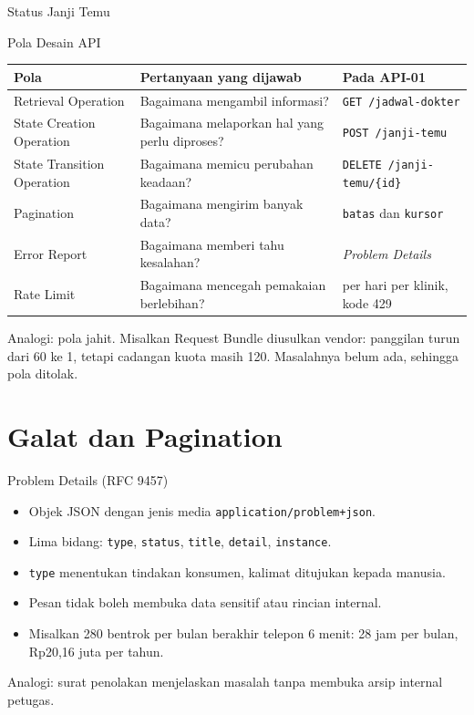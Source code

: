 \documentclass[aspectratio=169, table, 12pt]{beamer}
\begin{document}
\begin{frame}{{\Large Status Janji Temu}}
  \centering
\end{frame}

\begin{frame}{{\Large Pola Desain API}}
  \scriptsize
  \begin{tabularx}{\textwidth}{>{\raggedright\arraybackslash}p{3.6cm} >{\raggedright\arraybackslash}X >{\raggedright\arraybackslash}p{4.4cm}}
    \hline
    \textbf{Pola} & \textbf{Pertanyaan yang dijawab} & \textbf{Pada API-01} \\ \hline
    Retrieval Operation & Bagaimana mengambil informasi? & \texttt{GET /jadwal-dokter} \\ \hline
    State Creation Operation & Bagaimana melaporkan hal yang perlu diproses? & \texttt{POST /janji-temu} \\ \hline
    State Transition Operation & Bagaimana memicu perubahan keadaan? & \texttt{DELETE /janji-temu/\{id\}} \\ \hline
    Pagination & Bagaimana mengirim banyak data? & \texttt{batas} dan \texttt{kursor} \\ \hline
    Error Report & Bagaimana memberi tahu kesalahan? & \textit{Problem Details} \\ \hline
    Rate Limit & Bagaimana mencegah pemakaian berlebihan? & 300 per hari per klinik, kode 429 \\ \hline
  \end{tabularx}

  \vspace{8pt}
  \small Analogi: pola jahit. Misalkan Request Bundle diusulkan vendor: panggilan turun dari 60 ke 1, tetapi cadangan kuota masih 120. Masalahnya belum ada, sehingga pola ditolak.
\end{frame}

\section{Galat dan Pagination}

\begin{frame}{{\Large Problem Details (RFC 9457)}}
  \vspace{8pt}
  \begin{itemize}
    \item Objek JSON dengan jenis media \texttt{application/problem+json}.
    \item Lima bidang: \texttt{type}, \texttt{status}, \texttt{title}, \texttt{detail}, \texttt{instance}.
    \item \texttt{type} menentukan tindakan konsumen, kalimat ditujukan kepada manusia.
    \item Pesan tidak boleh membuka data sensitif atau rincian internal.
    \item Misalkan 280 bentrok per bulan berakhir telepon 6 menit: 28 jam per bulan, Rp20,16 juta per tahun.
  \end{itemize}
  \vspace{6pt}
  {\small Analogi: surat penolakan menjelaskan masalah tanpa membuka arsip internal petugas.}
\end{frame}
\end{document}
